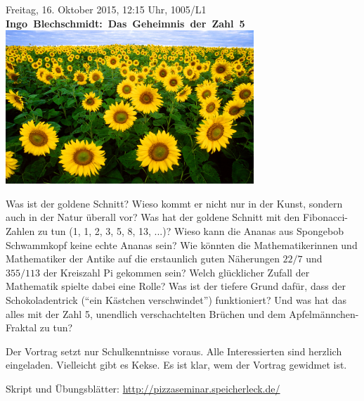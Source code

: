 \documentclass[a4paper,ngerman,landscape]{scrartcl}
\begin{document}
\begin{center}
  \Huge
  \vspace*{0.0em}
  Freitag, 16. Oktober 2015, 12:15 Uhr, 1005/L1 \\
  \mbox{\textbf{Ingo Blechschmidt: Das Geheimnis der Zahl 5}}
  \vfill
  \vspace{0.3em}
  \includegraphics[width=0.7\textwidth]{sonnenblumen}
  \vfill

  \huge
  \begin{minipage}{0.80\textwidth}
    \setlength\parskip{\medskipamount}
    \vspace{0.3em}
    Was ist der goldene Schnitt? Wieso kommt er nicht nur in der Kunst, sondern
    auch in der Natur überall vor? Was hat der goldene Schnitt mit den
    Fibonacci-Zahlen zu tun (1, 1, 2, 3, 5, 8, 13, ...)? Wieso kann die Ananas
    aus Spongebob Schwammkopf keine echte Ananas sein? Wie könnten die
    Mathematikerinnen und Mathematiker der Antike auf die erstaunlich guten
    Näherungen $22/7$ und $355/113$ der Kreiszahl Pi gekommen sein? Welch
    glücklicher Zufall der Mathematik spielte dabei eine Rolle? Was ist der
    tiefere Grund dafür, dass der Schokoladentrick ("`ein Kästchen
    verschwindet"') funktioniert? Und was hat das alles mit der Zahl 5,
    unendlich verschachtelten Brüchen und dem Apfelmännchen-Fraktal zu tun?

    Der Vortrag setzt nur Schulkenntnisse voraus. Alle Interessierten sind
    herzlich eingeladen. Vielleicht gibt es Kekse. Es ist klar, wem der Vortrag
    gewidmet ist.

    \vspace{1em}
    \hfill\small Skript und Übungsblätter: \url{http://pizzaseminar.speicherleck.de/}
  \end{minipage}
\end{center}
\end{document}
